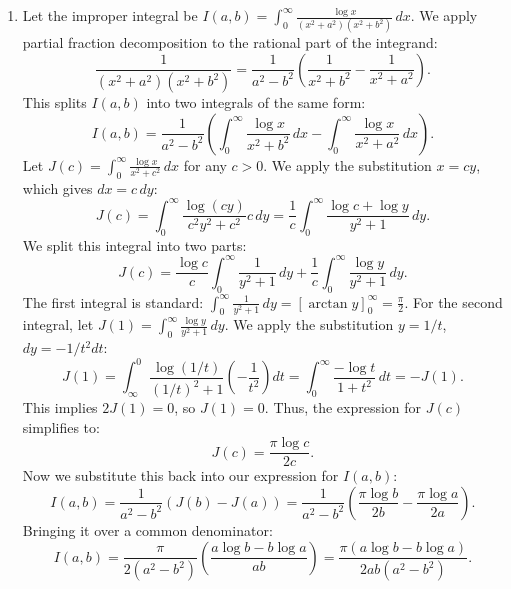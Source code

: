 \documentclass{article}
\begin{document}
\begin{enumerate}[label=\fbox{\arabic*}]
  \item %
        Let the improper integral be $I(a, b) = \int_0^\infty \frac{\log x}{(x^2 + a^2)(x^2 + b^2)} \, dx$.
        We apply partial fraction decomposition to the rational part of the integrand:
        \[
          \frac{1}{(x^2 + a^2)(x^2 + b^2)} = \frac{1}{a^2 - b^2} \left( \frac{1}{x^2 + b^2} - \frac{1}{x^2 + a^2} \right).
        \]
        This splits $I(a, b)$ into two integrals of the same form:
        \[
          I(a, b) = \frac{1}{a^2 - b^2} \left( \int_0^\infty \frac{\log x}{x^2 + b^2} \, dx - \int_0^\infty \frac{\log x}{x^2 + a^2} \, dx \right).
        \]
        Let $J(c) = \int_0^\infty \frac{\log x}{x^2 + c^2} \, dx$ for any $c > 0$. We apply the substitution $x = c y$, which gives $dx = c \, dy$:
        \[
          J(c) = \int_0^\infty \frac{\log(c y)}{c^2 y^2 + c^2} c \, dy = \frac{1}{c} \int_0^\infty \frac{\log c + \log y}{y^2 + 1} \, dy.
        \]
        We split this integral into two parts:
        \[
          J(c) = \frac{\log c}{c} \int_0^\infty \frac{1}{y^2 + 1} \, dy + \frac{1}{c} \int_0^\infty \frac{\log y}{y^2 + 1} \, dy.
        \]
        The first integral is standard: $\int_0^\infty \frac{1}{y^2 + 1} \, dy = \left[ \arctan y \right]_0^\infty = \frac{\pi}{2}$.
        For the second integral, let $J(1) = \int_0^\infty \frac{\log y}{y^2 + 1} \, dy$. We apply the substitution $y = 1/t$, $dy = -1/t^2 dt$:
        \[
          J(1) = \int_\infty^0 \frac{\log(1/t)}{(1/t)^2 + 1} \left( -\frac{1}{t^2} \right) dt = \int_0^\infty \frac{-\log t}{1 + t^2} \, dt = -J(1).
        \]
        This implies $2J(1) = 0$, so $J(1) = 0$.
        Thus, the expression for $J(c)$ simplifies to:
        \[
          J(c) = \frac{\pi \log c}{2c}.
        \]
        Now we substitute this back into our expression for $I(a, b)$:
        \[
          I(a, b) = \frac{1}{a^2 - b^2} (J(b) - J(a)) = \frac{1}{a^2 - b^2} \left( \frac{\pi \log b}{2b} - \frac{\pi \log a}{2a} \right).
        \]
        Bringing it over a common denominator:
        \[
          I(a, b) = \frac{\pi}{2(a^2 - b^2)} \left( \frac{a \log b - b \log a}{ab} \right) = \frac{\pi (a \log b - b \log a)}{2ab(a^2 - b^2)}.
        \]


\end{enumerate}
\end{document}
